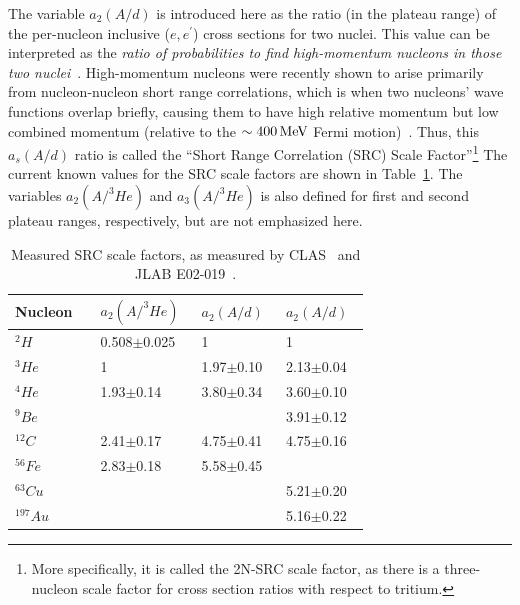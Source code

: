 The variable $a_2(A/d)$ is introduced here as the ratio (in the plateau range) of the per-nucleon inclusive ($e,e^\prime$) cross sections for two nuclei. This value can be interpreted as the \emph{ratio of probabilities to find high-momentum nucleons in those two nuclei}~\cite{PhysRevLett.106.052301}. High-momentum nucleons were recently shown to arise primarily from nucleon-nucleon short range correlations, which is when two nucleons' wave functions overlap briefly, causing them to have high relative momentum but low combined momentum (relative to the $\sim\unit[400]{MeV}$ Fermi motion)~\cite{PhysRevLett.100.162503}.  Thus, this $a_s(A/d)$ ratio is called the ``Short Range Correlation (SRC) Scale Factor''\footnote{More specifically, it is called the 2N-SRC scale factor, as there is a three-nucleon scale factor for cross section ratios with respect to tritium.}  The current known values for the SRC scale factors are shown in Table~\ref{tab:a2-src}. The variables $a_2(A/^3He)$ and $a_3(A/^3He)$ is also defined for first and second plateau ranges, respectively, but are not emphasized here.

\begin{table}
	\centering
	\setlength{\tabcolsep}{2em}
	\begin{tabular}{@{}lllll@{}}\toprule
		Nucleon & & $a_2(A/^3He)$~\cite{Egiyan:2005hs} & $a_2(A/d)$~\cite{PhysRevLett.106.052301} & $a_2(A/d)$~\cite{Fomin:2011ng} \\ \midrule    
		$^2H$ & &     0.508$\pm$0.025         & 1                                 &  1 \\
		$^3He$ & & 1                                  & 1.97$\pm$0.10        & 2.13$\pm$0.04 \\
		$^4He$ & & 1.93$\pm$0.14            & 3.80$\pm$0.34      &  3.60$\pm$0.10 \\
		$^9Be$ & &                                        &                               & 3.91$\pm$0.12 \\
		$^{12}C$ & & 2.41$\pm$0.17            & 4.75$\pm$0.41          & 4.75$\pm$0.16  \\
		$^{56}Fe$ & & 2.83$\pm$0.18           & 5.58$\pm$0.45        &  \\
		$^{63}Cu$ & &                                 &                                 & 5.21$\pm$0.20 \\
		$^{197}Au$ & &                                 &                                 & 5.16$\pm$0.22 \\ \bottomrule        
	\end{tabular}
	\caption{Measured SRC scale factors, as measured by CLAS~\cite{Egiyan:2005hs} and JLAB E02-019~\cite{PhysRevLett.106.052301, Fomin:2011ng}.}
	\label{tab:a2-src}
\end{table}

